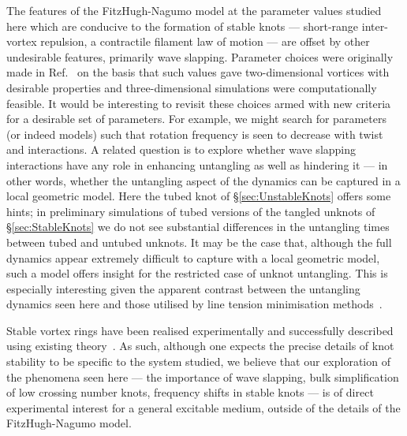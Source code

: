The features of the FitzHugh-Nagumo model at the parameter values studied here which are conducive to the formation of stable knots --- short-range inter-vortex repulsion, a contractile filament law of motion --- are offset by other undesirable features, primarily wave slapping. Parameter choices were originally made in Ref.~\citep{Henze1993} on the basis that such values gave two-dimensional vortices with desirable properties and three-dimensional simulations were computationally feasible. It would be interesting to revisit these choices armed with new criteria for a desirable set of parameters. For example, we might search for parameters (or indeed models) such that rotation frequency is seen to decrease with twist and interactions. A related question is to explore whether wave slapping interactions have any role in enhancing untangling as well as hindering it --- in other words, whether the untangling aspect of the dynamics can be captured in a local geometric model. Here the tubed knot of \S\ref{sec:UnstableKnots} offers some hints; in preliminary simulations of tubed versions of the tangled unknots of \S\ref{sec:StableKnots} we do not see substantial differences in the untangling times between tubed and untubed unknots. It may be the case that, although the full dynamics appear extremely difficult to capture with a local geometric model, such a model offers insight for the restricted case of unknot untangling. This is especially interesting given the apparent contrast between the untangling dynamics seen here and those utilised by line tension minimisation methods~\citep{Maucher2016}. 

Stable vortex rings have been realised experimentally and successfully described using existing theory~\citep{Steinbock2006, Azhand2014, Totz2015}. As such, although one expects the precise details of knot stability to be specific to the system studied, we believe that our exploration of the phenomena seen here --- the importance of wave slapping, bulk simplification of low crossing number knots, frequency shifts in stable knots --- is of direct experimental interest for a general excitable medium, outside of the details of the FitzHugh-Nagumo model. 
